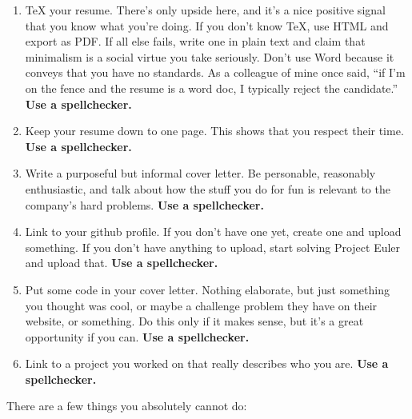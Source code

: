 \documentclass{article}
\begin{document}
\begin{enumerate}
\item{\TeX{} your resume. There's only upside here, and it's a nice}
  positive signal that you know what you're doing. If you don't know
  \TeX{}, use HTML and export as PDF. If all else fails, write one in plain
  text and claim that minimalism is a social virtue you take seriously.
  Don't use Word because it conveys that you have no standards. As a
  colleague of mine once said, ``if I'm on the fence and the resume is a
  word doc, I typically reject the candidate.'' {\bf Use a spellchecker.}

\item{Keep your resume down to one page. This shows that you respect their}
  time. {\bf Use a spellchecker.}

\item{Write a purposeful but informal cover letter. Be personable,}
  reasonably enthusiastic, and talk about how the stuff you do for fun is
  relevant to the company's hard problems. {\bf Use a spellchecker.}

\item{Link to your github profile. If you don't have one yet, create one}
  and upload something. If you don't have anything to upload, start solving
  Project Euler and upload that. {\bf Use a spellchecker.}

\item{Put some code in your cover letter. Nothing elaborate, but just}
  something you thought was cool, or maybe a challenge problem they have on
  their website, or something. Do this only if it makes sense, but it's a
  great opportunity if you can. {\bf Use a spellchecker.}

\item{Link to a project you worked on that really describes who you are.}
  {\bf Use a spellchecker.}
\end{enumerate}

  There are a few things you absolutely cannot do:
\end{document}
